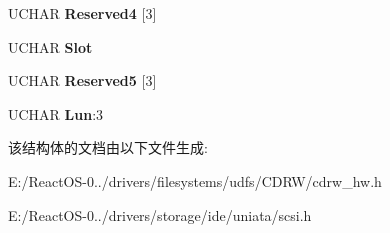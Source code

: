 \begin{DoxyCompactItemize}
\item 
\mbox{\label{struct___c_d_b_1_1___l_o_a_d___u_n_l_o_a_d_a373f87a34664679c0322b6b6f23f00fc}} 
U\+C\+H\+AR {\bfseries Reserved4} \mbox{[}3\mbox{]}
\item 
\mbox{\label{struct___c_d_b_1_1___l_o_a_d___u_n_l_o_a_d_a3bcf508cb7473cdd21aa899feb7d4d24}} 
U\+C\+H\+AR {\bfseries Slot}
\item 
\mbox{\label{struct___c_d_b_1_1___l_o_a_d___u_n_l_o_a_d_a73d95c71e39796a3328da419443fd9b9}} 
U\+C\+H\+AR {\bfseries Reserved5} \mbox{[}3\mbox{]}
\item 
\mbox{\label{struct___c_d_b_1_1___l_o_a_d___u_n_l_o_a_d_aec73b3d3adc8f3e9130e1b84c00c8b54}} 
U\+C\+H\+AR {\bfseries Lun}\+:3
\end{DoxyCompactItemize}


该结构体的文档由以下文件生成\+:\begin{DoxyCompactItemize}
\item 
E\+:/\+React\+O\+S-\/0../drivers/filesystems/udfs/\+C\+D\+R\+W/cdrw\+\_\+hw.\+h\item 
E\+:/\+React\+O\+S-\/0../drivers/storage/ide/uniata/scsi.\+h\end{DoxyCompactItemize}
